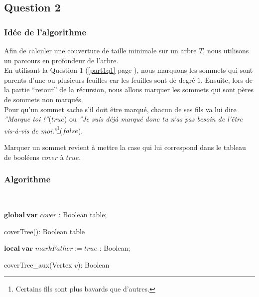   \subsection{Question 2}
  
   \subsubsection{Idée de l'algorithme}
   Afin de calculer une couverture de taille minimale sur un arbre $T$,
   nous utilisons un parcours en profondeur de l'arbre.\\
   En utilisant la Question 1 (\ref{part1q1} page \pageref{part1q1}),
   nous marquons les sommets qui sont parents d'une ou plusieurs
   feuilles car les feuilles sont de degré $1$. Ensuite, lors de la
   partie ``retour'' de la récursion, nous allons marquer les sommets
   qui sont pères de sommets non marqués.\\

   Pour qu'un sommet sache s'il doit être marqué, chacun de ses fils va
   lui dire \emph{''Marque toi !''}($true$) ou \emph{''Je suis déjà
   marqué donc tu n'as pas besoin de l'être vis-à-vis de
   moi.''}\footnote{Certains fils sont plus bavards que
   d'autres.}($false$).

   Marquer un sommet revient à mettre la case qui lui correspond dans
   le tableau de booléens $cover$ à $true$.
   
   \subsubsection{Algorithme}
   ~
   \begin{algorithm}[!ht]
     \SetLine
     $\mathbf{global~var}$ $cover$ : Boolean table;\\
     \caption{coverTree(): Boolean table}
   \end{algorithm}

   \begin{algorithm}[!ht]
     \SetLine
     $\mathbf{local~var}$ $markFather := true$ : Boolean;\\
     \caption{coverTree\_aux(Vertex $v$): Boolean}
   \end{algorithm}
   
